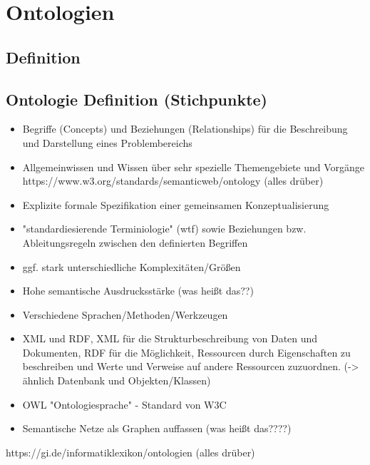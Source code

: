 \chapter{Ontologien}
\section{Definition}
\section*{Ontologie Definition (Stichpunkte)}
\begin{itemize}
	\item Begriffe (Concepts) und Beziehungen (Relationships) für die Beschreibung und Darstellung eines Problembereichs
	\item Allgemeinwissen und Wissen über sehr spezielle Themengebiete und Vorgänge
	https://www.w3.org/standards/semanticweb/ontology (alles drüber)
	\item Explizite formale Spezifikation einer gemeinsamen Konzeptualisierung
	\item "standardiesierende Terminiologie" (wtf) sowie Beziehungen bzw. Ableitungsregeln zwischen den definierten Begriffen
	\item ggf. stark unterschiedliche Komplexitäten/Größen
	\item Hohe semantische Ausdrucksstärke (was heißt das??)
	\item Verschiedene Sprachen/Methoden/Werkzeugen
	\item	XML und RDF, XML für die Strukturbeschreibung von Daten und Dokumenten, RDF für die Möglichkeit, Ressourcen durch Eigenschaften zu beschreiben und Werte und Verweise auf andere Ressourcen zuzuordnen.
		(-> ähnlich Datenbank und Objekten/Klassen)
	\item OWL "Ontologiesprache" - Standard von W3C
	\item Semantische Netze als Graphen auffassen (was heißt das????)
\end{itemize}
	https://gi.de/informatiklexikon/ontologien (alles drüber)

